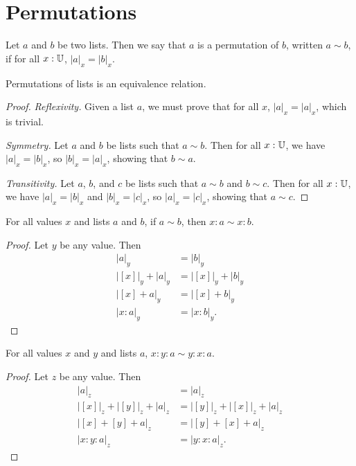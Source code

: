 \documentclass[../../math.tex]{subfiles}
\begin{document}
\section{Permutations}

\begin{definition}
    Let $a$ and $b$ be two lists.  Then we say that $a$ is a permutation of $b$,
    written $a \sim b$, if for all $x : \mathbb{U}$, $|a|_x = |b|_x$.
\end{definition}

\begin{instance}
    Permutations of lists is an equivalence relation.
\end{instance}
\begin{proof}
    \textit{Reflexivity.}  Given a list $a$, we must prove that for all $x$,
    $|a|_x = |a|_x$, which is trivial.

    \textit{Symmetry.}  Let $a$ and $b$ be lists such that $a \sim b$.  Then for
    all $x : \mathbb{U}$, we have $|a|_x = |b|_x$, so $|b|_x = |a|_x$, showing that $b
    \sim a$.

    \textit{Transitivity.} Let $a$, $b$, and $c$ be lists such that $a \sim b$
    and $b \sim c$.  Then for all $x : \mathbb{U}$, we have $|a|_x = |b|_x$ and $|b|_x =
    |c|_x$, so $|a|_x = |c|_x$, showing that $a \sim c$.
\end{proof}

\begin{theorem} \label{list_perm_skip}
    For all values $x$ and lists $a$ and $b$, if $a \sim b$, then $x : a \sim x
    : b$.
\end{theorem}
\begin{proof}
    Let $y$ be any value.  Then
    \begin{align*}
        |a|_y &= |b|_y \\
        |[x]|_y + |a|_y &= |[x]|_y + |b|_y \\
        |[x] + a|_y &= |[x] + b|_y \\
        |x : a|_y &= |x : b|_y.
    \end{align*}
\end{proof}

\begin{theorem} \label{list_perm_swap}
    For all values $x$ and $y$ and lists $a$, $x : y : a \sim y : x : a$.
\end{theorem}
\begin{proof}
    Let $z$ be any value.  Then
    \begin{align*}
        |a|_z &= |a|_z \\
        |[x]|_z + |[y]|_z + |a|_z &= |[y]|_z + |[x]|_z + |a|_z \\
        |[x] + [y] + a|_z &= |[y] + [x] + a|_z \\
        |x : y : a|_z &= |y : x : a|_z.
    \end{align*}
\end{proof}
\end{document}
